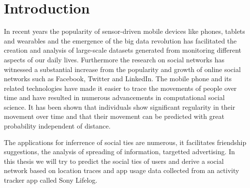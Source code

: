\section{Introduction}
In recent years the popularity of sensor-driven mobile devices like phones, tablets and wearables and the emergence of the big data revolution has facilitated the creation and analysis of large-scale datasets generated from monitoring different aspects of our daily lives\cite{lazer2009life}. Furthermore the research on social networks has witnessed a substantial increase from the popularity and growth of online social networks such as Facebook, Twitter and LinkedIn\cite{social_networks}. The mobile phone and its related technologies have made it easier to trace the movements of people over time and have resulted in numerous advancements in computational social science. It has been shown that individuals show significant regularity in their movement over time\cite{Uihmp} and that their movement can be predicted with great probability independent of distance\cite{LoPiHM}.

The applications for inferrence of social ties are numerous, it facilitates friendship suggestions, the analysis of spreading of information, targetted advertising.
In this thesis we will try to predict the social ties of users and derive a social network based on location traces and app usage data collected from an activity tracker app called Sony Lifelog\cite{sonyLifeLog}.

